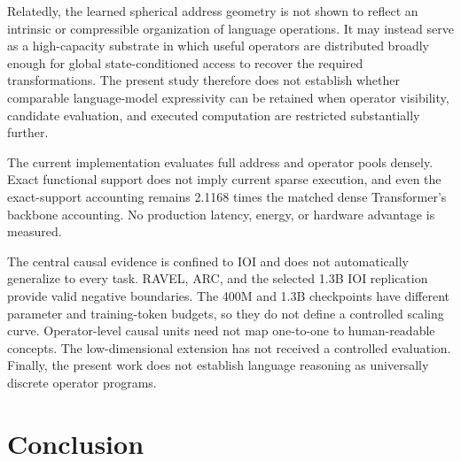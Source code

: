 \documentclass{article}
\begin{document}
Relatedly, the learned spherical address geometry is not shown to reflect an
intrinsic or compressible organization of language operations. It may instead
serve as a high-capacity substrate in which useful operators are distributed
broadly enough for global state-conditioned access to recover the required
transformations. The present study therefore does not establish whether
comparable language-model expressivity can be retained when operator visibility,
candidate evaluation, and executed computation are restricted substantially
further.

The current implementation evaluates full address and operator pools densely.
Exact functional support does not imply current sparse execution, and even the
exact-support accounting remains 2.1168 times the matched dense Transformer's
backbone accounting. No production latency, energy, or hardware advantage is
measured.

The central causal evidence is confined to IOI and does not automatically
generalize to every task. RAVEL, ARC, and the selected 1.3B IOI replication
provide valid negative boundaries. The 400M and 1.3B checkpoints have
different parameter and training-token budgets, so they do not define a
controlled scaling curve. Operator-level causal units need not map one-to-one
to human-readable concepts. The low-dimensional extension has not received a
controlled evaluation. Finally, the present work does not establish language
reasoning as universally discrete operator programs.

\section{Conclusion}
\end{document}
